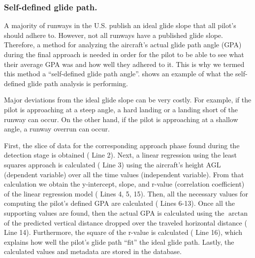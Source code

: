         
        \subsubsection{Self-defined glide path.}
        
        	A majority of runways in the U.S. publish an ideal glide slope that all pilot's should adhere to.  However, not all runways have a published glide slope.  Therefore, a method for analyzing the aircraft's actual glide path angle (GPA) during the final approach is needed in order for the pilot to be able to see what their average GPA was and how well they adhered to it.  This is why we termed this method a ``self-defined glide path angle''.   shows an example of what the self-defined glide path analysis is performing.
            
            Major deviations from the ideal glide slope can be very costly.  For example, if the pilot is approaching at a steep angle, a hard landing or a landing short of the runway can occur.  On the other hand, if the pilot is approaching at a shallow angle, a runway overrun can occur.
            
            First, the slice of data for the corresponding approach phase found during the detection stage is obtained ( Line 2).  Next, a linear regression using the least squares approach is calculated ( Line 3) using the aircraft's height AGL (dependent variable) over all the time values (independent variable).  From that calculation we obtain the y-intercept, slope, and r-value (correlation coefficient) of the linear regression model ( Lines 4, 5, 15).  Then, all the necessary values for computing the pilot's defined GPA are calculated ( Lines 6-13).  Once all the supporting values are found, then the actual GPA is calculated using the $\arctan$ of the predicted vertical distance dropped over the traveled horizontal distance ( Line 14).  Furthermore, the square of the r-value is calculated ( Line 16), which explains how well the pilot's glide path ``fit'' the ideal glide path.  Lastly, the calculated values and metadata are stored in the database.
            
